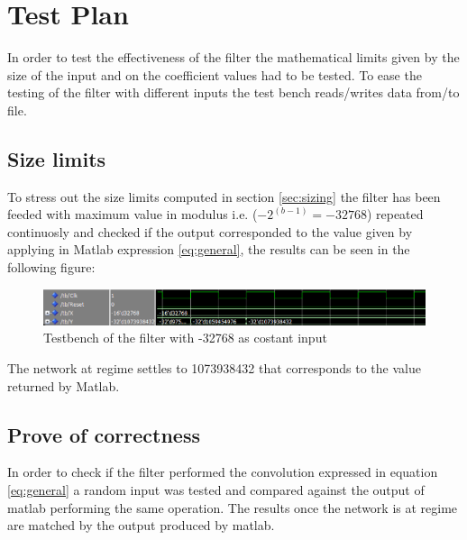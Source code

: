 \section{Test Plan}
In order to test the effectiveness of the filter the mathematical limits given by the size of the input and on the coefficient values had to be tested.
To ease the testing of the filter with different inputs the test bench reads/writes data from/to file.
\subsection{Size limits}
To stress out the size limits computed in section \ref{sec:sizing} the filter has been feeded with maximum value in modulus i.e. ($-2^(b-1)= -32768 $) repeated continuosly and checked if the output corresponded to the value given by applying in Matlab expression \ref{eq:general}, the results can be seen in the following figure:
\begin{figure}[H]
  \centering
  \includegraphics[width=0.9\linewidth]{./images/simul32768.PNG}
  \caption{Testbench of the filter with -32768 as costant input}
  \label{fig:32768}
\end{figure}
The network at regime settles to 1073938432 that corresponds to the value returned by Matlab.
\subsection{Prove of correctness}
In order to check if the filter performed the convolution expressed in equation \ref{eq:general} a random input was tested and compared against the output of matlab performing the same operation. The results once the network is at regime are matched by the output produced by matlab.
